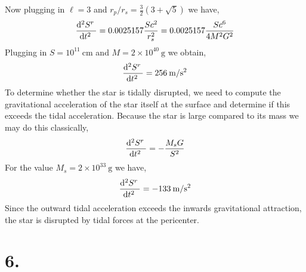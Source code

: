 \documentclass[12pt]{article}
\begin{document}
\begin{enumerate}
Now plugging in $\ell = 3$ and $r_p/r_s = \frac{3}{2} (3 + \sqrt{5})$ we have,
\[ \frac{\mathrm{d}^{2} S^r \:}{\mathrm{d}t^{2} \:} = 0.0025157 \frac{Sc^2}{r_s^2} = 0.0025157 \frac{S c^6}{4 M^2 G^2} \]
Plugging in $S = 10^{11} \: \mathrm{cm}$ and $M = 2 \times 10^{40} \: \mathrm{g}$ we obtain,
\[ \frac{\mathrm{d}^{2} S^r \:}{\mathrm{d}t^{2} \:} = 256 \: \mathrm{m} / \mathrm{s}^2 \]
To determine whether the star is tidally disrupted, we need to compute the gravitational acceleration of the star itself at the surface and determine if this exceeds the tidal acceleration. Because the star is large compared to its mass we may do this classically,
\[ \frac{\mathrm{d}^{2} S^r \:}{\mathrm{d}t^{2} \:} = - \frac{M_sG}{S^2} \] 
For the value $M_s = 2 \times 10^{33} \: \mathrm{g}$ we have,
\[ \frac{\mathrm{d}^{2} S^r \:}{\mathrm{d}t^{2} \:} = - 133 \: \mathrm{m} / \mathrm{s}^2 \]
Since the outward tidal acceleration exceeds the inwards gravitational attraction, the star is disrupted by tidal forces at the pericenter. 
\end{enumerate}

\section*{6.}
\end{document}
